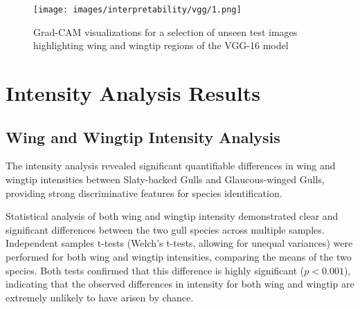 \documentclass[a4paper,12pt]{report}
\begin{document}
\begin{figure}[H]
    \centering
    \texttt{[image: images/interpretability/vgg/1.png]}
    \caption{Grad-CAM visualizations for a selection of unseen test images highlighting wing and wingtip regions of the VGG-16 model}
    \label{fig:vgg16_gradcam}
\end{figure}

\section{Intensity Analysis Results}

\subsection{Wing and Wingtip Intensity Analysis}

The intensity analysis revealed significant quantifiable differences in wing and wingtip intensities between Slaty-backed Gulls and Glaucous-winged Gulls, providing strong discriminative features for species identification.

Statistical analysis of both wing and wingtip intensity demonstrated clear and significant differences between the two gull species across multiple samples. Independent samples t-tests (Welch's t-tests, allowing for unequal variances) were performed for both wing and wingtip intensities, comparing the means of the two species. Both tests confirmed that this difference is highly significant ($p < 0.001$), indicating that the observed differences in intensity for both wing and wingtip are extremely unlikely to have arisen by chance.

\begin{table}[H]
    \centering
    \caption{Wing and Wingtip Intensity Statistical Summary}
    \label{tab:intensity-stats-combined}
\end{table}
\end{document}
